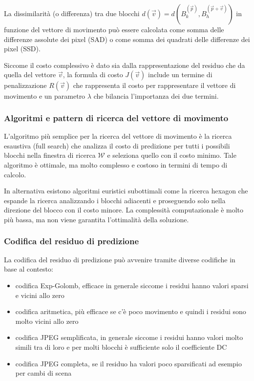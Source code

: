 La dissimilarità (o differenza) tra due blocchi \(d(\vec{v}) = d(B_k^{(\vec{p})}, B_h^{(\vec{p} + \vec{v})})\) in
funzione del vettore di movimento può essere calcolata come somma delle differenze assolute dei pixel (SAD) o come
somma dei quadrati delle differenze dei pixel (SSD).

Siccome il costo complessivo è dato sia dalla rappresentazione del residuo che da quella del vettore \(\vec{v}\),
la formula di costo \(J(\vec{v})\) include un termine di penalizzazione \(R(\vec{v})\) che rappresenta il costo
per rappresentare il vettore di movimento e un parametro \(\lambda\) che bilancia l'importanza dei due termini.

\subsubsection*{Algoritmi e pattern di ricerca del vettore di movimento}
L'algoritmo più semplice per la ricerca del vettore di movimento è la ricerca esaustiva (full search) che analizza il costo
di predizione per tutti i possibili blocchi nella finestra di ricerca \(\mathcal{W}\) e seleziona quello con il costo minimo.
Tale algoritmo è ottimale, ma molto complesso e costoso in termini di tempo di calcolo.

In alternativa esistono algoritmi euristici subottimali come la ricerca hexagon che espande la ricerca analizzando i blocchi
adiacenti e proseguendo solo nella direzione del blocco con il costo minore. La complessità computazionale è molto più bassa,
ma non viene garantita l'ottimalità della soluzione.

\subsubsection*{Codifica del residuo di predizione}
La codifica del residuo di predizione può avvenire tramite diverse codifiche in base al contesto:
\begin{itemize}
	\item codifica Exp-Golomb, efficace in generale siccome i residui hanno valori sparsi e vicini allo zero
	\item codifica aritmetica, più efficace se c'è poco movimento e quindi i residui sono molto vicini allo zero
	\item codifica JPEG semplificata, in generale siccome i residui hanno valori molto simili tra di loro e per molti blocchi
	è sufficiente solo il coefficiente DC
	\item codifica JPEG completa, se il residuo ha valori poco sparsificati ad esempio per cambi di scena
\end{itemize}


